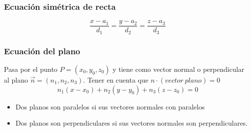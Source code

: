 \subsubsection{Ecuación simétrica de recta}
$$\dfrac{x-a_1}{d_1}=\dfrac{y-a_2}{d_2}=\dfrac{z-a_3}{d_3}$$

\subsubsection{Ecuación del plano}
Pasa por el punto $P=(x_0,y_0,z_0)$ y tiene como vector normal o perpendicular al plano $\overrightarrow{n}=(n_1,n_2,n_3)$. Tener en cuenta que $n\cdot (vector\ plano)=0$
$$n_1(x-x_0)+n_2(y-y_0)+n_3(z-z_0)=0$$

\begin{itemize}
	\item Dos planos son paralelos si sus vectores normales con paralelos
	\item Dos planos son perpendiculares si sus vectores normales son perpendiculares.
\end{itemize}
